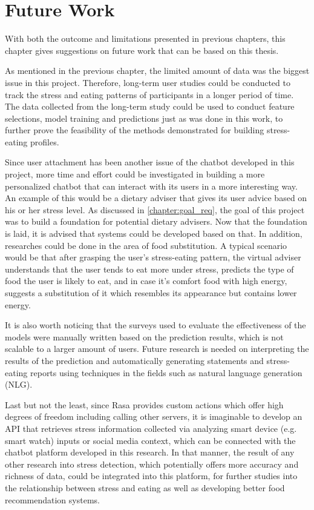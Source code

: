 
\chapter{Future Work}\label{chapter:future_work}
With both the outcome and limitations presented in previous chapters, this chapter gives suggestions on future work that can be based on this thesis.\bigskip

\noindent As mentioned in the previous chapter, the limited amount of data was the biggest issue in this project. Therefore, long-term user studies could be conducted to track the stress and eating patterns of participants in a longer period of time. The data collected from the long-term study could be used to conduct feature selections, model training and predictions just as was done in this work, to further prove the feasibility of the methods demonstrated for building stress-eating profiles.\bigskip

\noindent Since user attachment has been another issue of the chatbot developed in this project, more time and effort could be investigated in building a more personalized chatbot that can interact with its users in a more interesting way. An example of this would be a dietary adviser that gives its user advice based on his or her stress level. As discussed in \autoref{chapter:goal_req}, the goal of this project was to build a foundation for potential dietary advisers. Now that the foundation is laid, it is advised that systems could be developed based on that. In addition, researches could be done in the area of food substitution. A typical scenario would be that after grasping the user's stress-eating pattern, the virtual adviser understands that the user tends to eat more under stress, predicts the type of food the user is likely to eat, and in case it's comfort food with high energy, suggests a substitution of it which resembles its appearance but contains lower energy.\bigskip

\noindent It is also worth noticing that the surveys used to evaluate the effectiveness of the models were manually written based on the prediction results, which is not scalable to a larger amount of users. Future research is needed on interpreting the results of the prediction and automatically generating statements and stress-eating reports using techniques in the fields such as natural language generation (NLG).\bigskip

\noindent Last but not the least, since Rasa provides custom actions which offer high degrees of freedom including calling other servers, it is imaginable to develop an API that retrieves stress information collected via analyzing smart device (e.g. smart watch) inputs or social media context, which can be connected with the chatbot platform developed in this research. In that manner, the result of any other research into stress detection, which potentially offers more accuracy and richness of data, could be integrated into this platform, for further studies into the relationship between stress and eating as well as developing better food recommendation systems.
